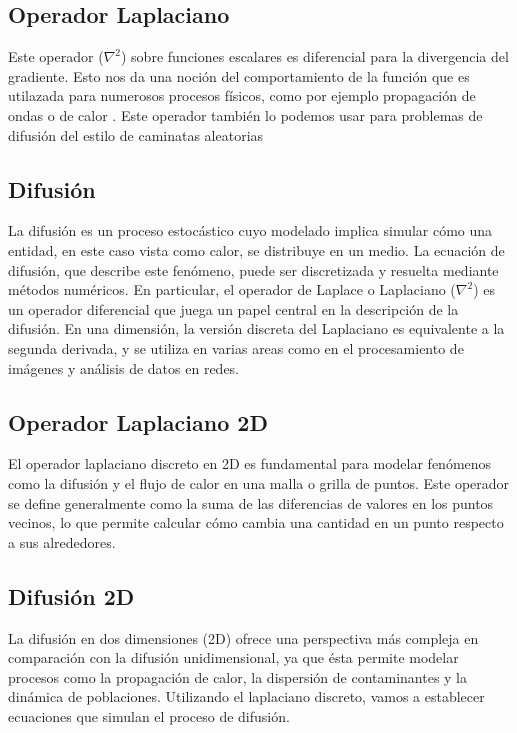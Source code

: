 \subsection{Operador Laplaciano}
\label{Intro_laplaciano}

Este operador ($\nabla^{2}$) sobre funciones escalares es diferencial para la divergencia del gradiente. Esto nos da una noción del comportamiento de la función que es utilazada para numerosos procesos físicos, como por ejemplo propagación de ondas o de calor \cite{laplaciano_web}. Este operador también lo podemos usar para problemas de difusión del estilo de caminatas aleatorias \cite{random_walk}

\subsection{Difusión}
\label{Intro_difusion}

 La difusión es un proceso estocástico cuyo modelado implica simular cómo una entidad, en este caso vista como calor, se distribuye en un medio. La ecuación de difusión, que describe este fenómeno, puede ser discretizada y resuelta mediante métodos numéricos. En particular, el operador de Laplace o Laplaciano ($\nabla^{2}$) es un operador diferencial que juega un papel central en la descripción de la difusión. En una dimensión, la versión discreta del Laplaciano es equivalente a la segunda derivada, y se utiliza en varias areas como en el procesamiento de imágenes y análisis de datos en redes.


\subsection{Operador Laplaciano 2D}
\label{Intro_laplaciano2D}
El operador laplaciano discreto en 2D es fundamental para modelar fenómenos como la difusión y el flujo de calor en una malla o grilla de puntos. Este operador se define generalmente como la suma de las diferencias de valores en los puntos vecinos, lo que permite calcular cómo cambia una cantidad en un punto respecto a sus alrededores.

\subsection{Difusión 2D}
\label{Intro_difusion2D}
 La difusión en dos dimensiones (2D) ofrece una perspectiva más compleja en comparación con la difusión unidimensional, ya que ésta permite modelar procesos como la propagación de calor, la dispersión de contaminantes y la dinámica de poblaciones. Utilizando el laplaciano discreto, vamos a establecer ecuaciones que simulan el proceso de difusión.